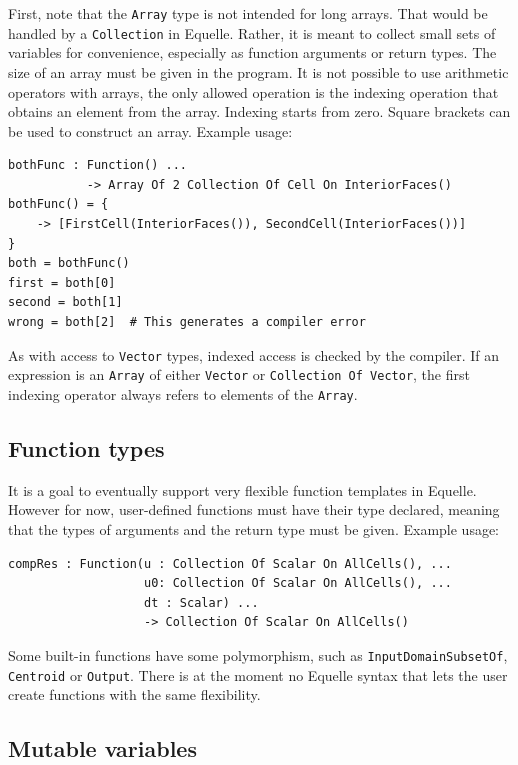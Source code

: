 \documentclass[11pt]{article}
\newcommand{\code}[1]{\texttt{#1}}
\begin{document}
First, note that the \code{Array} type is not intended for long arrays. That would be
handled by a \code{Collection} in Equelle. Rather, it is meant to collect small sets of
variables for convenience, especially as function arguments or return types. The size of
an array must be given in the program. It is not possible to use arithmetic operators with
arrays, the only allowed operation is the indexing operation that obtains an element from
the array. Indexing starts from zero. Square brackets can be used to construct an
array. Example usage:
\begin{verbatim}
bothFunc : Function() ...
           -> Array Of 2 Collection Of Cell On InteriorFaces()
bothFunc() = {
    -> [FirstCell(InteriorFaces()), SecondCell(InteriorFaces())]
}
both = bothFunc()
first = both[0]
second = both[1]
wrong = both[2]  # This generates a compiler error
\end{verbatim}

As with access to \code{Vector} types, indexed access is checked by the compiler. If an
expression is an \code{Array} of either \code{Vector} or \code{Collection Of Vector}, the
first indexing operator always refers to elements of the \code{Array}.

\subsection{Function types}

It is a goal to eventually support very flexible function templates in Equelle. However
for now, user-defined functions must have their type declared, meaning that the types of
arguments and the return type must be given. Example usage:

\begin{verbatim}
compRes : Function(u : Collection Of Scalar On AllCells(), ...
                   u0: Collection Of Scalar On AllCells(), ...
                   dt : Scalar) ...
                   -> Collection Of Scalar On AllCells()
\end{verbatim}

Some built-in functions have some polymorphism, such as \code{InputDomainSubsetOf},
\code{Centroid} or \code{Output}. There is at the moment no Equelle syntax that lets the
user create functions with the same flexibility.

\subsection{Mutable variables}
\end{document}
